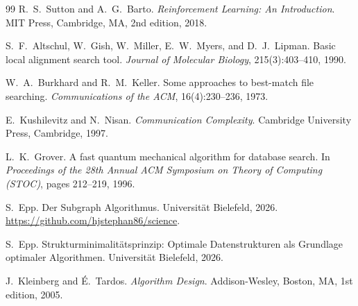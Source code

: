 ﻿\documentclass[a4paper,12pt]{article}
\theoremstyle{definition}
\begin{document}
\begin{thebibliography}{99}
R.\ S.\ Sutton and A.\ G.\ Barto.
\newblock \textit{Reinforcement Learning: An Introduction}.
\newblock MIT Press, Cambridge, MA, 2nd edition, 2018.

S.\ F.\ Altschul, W.\ Gish, W.\ Miller, E.\ W.\ Myers, and D.\ J.\ Lipman.
\newblock Basic local alignment search tool.
\newblock \textit{Journal of Molecular Biology}, 215(3):403--410, 1990.

W.\ A.\ Burkhard and R.\ M.\ Keller.
\newblock Some approaches to best-match file searching.
\newblock \textit{Communications of the ACM}, 16(4):230--236, 1973.

E.\ Kushilevitz and N.\ Nisan.
\newblock \textit{Communication Complexity}.
\newblock Cambridge University Press, Cambridge, 1997.

L.\ K.\ Grover.
\newblock A fast quantum mechanical algorithm for database search.
\newblock In \textit{Proceedings of the 28th Annual ACM Symposium on Theory
         of Computing (STOC)}, pages 212--219, 1996.

S.\ Epp.
\newblock Der Subgraph Algorithmus.
\newblock Universit\"{a}t Bielefeld, 2026.
\newblock \url{https://github.com/hjstephan86/science}.

S.\ Epp.
\newblock Strukturminimalit\"{a}tsprinzip: Optimale Datenstrukturen als
         Grundlage optimaler Algorithmen.
\newblock Universit\"{a}t Bielefeld, 2026.

J.\ Kleinberg and \'{E}.\ Tardos.
\newblock \textit{Algorithm Design}.
\newblock Addison-Wesley, Boston, MA, 1st edition, 2005.

\end{thebibliography}
\end{document}
